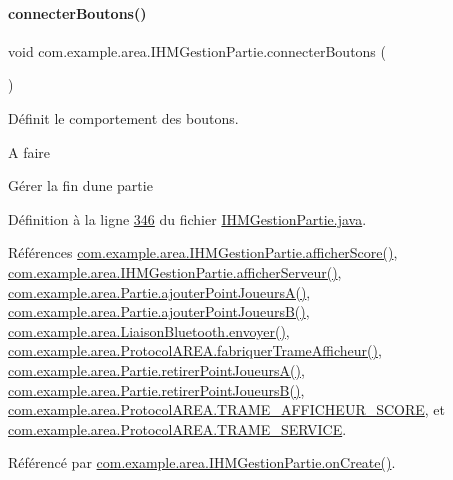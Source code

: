 \paragraph{\texorpdfstring{connecter\+Boutons()}{connecterBoutons()}}
{\footnotesize\ttfamily void com.\+example.\+area.\+I\+H\+M\+Gestion\+Partie.\+connecter\+Boutons (\begin{DoxyParamCaption}{ }\end{DoxyParamCaption})\hspace{0.3cm}{\ttfamily [private]}}



Définit le comportement des boutons. 

\begin{DoxyRefDesc}{A faire}
\item[\hyperlink{todo__todo000004}{A faire}]Gérer la fin d\textquotesingle{}une partie \end{DoxyRefDesc}


Définition à la ligne \hyperlink{_i_h_m_gestion_partie_8java_source_l00346}{346} du fichier \hyperlink{_i_h_m_gestion_partie_8java_source}{I\+H\+M\+Gestion\+Partie.\+java}.



Références \hyperlink{_i_h_m_gestion_partie_8java_source_l00435}{com.\+example.\+area.\+I\+H\+M\+Gestion\+Partie.\+afficher\+Score()}, \hyperlink{_i_h_m_gestion_partie_8java_source_l00447}{com.\+example.\+area.\+I\+H\+M\+Gestion\+Partie.\+afficher\+Serveur()}, \hyperlink{_partie_8java_source_l00128}{com.\+example.\+area.\+Partie.\+ajouter\+Point\+Joueurs\+A()}, \hyperlink{_partie_8java_source_l00147}{com.\+example.\+area.\+Partie.\+ajouter\+Point\+Joueurs\+B()}, \hyperlink{_liaison_bluetooth_8java_source_l00202}{com.\+example.\+area.\+Liaison\+Bluetooth.\+envoyer()}, \hyperlink{_protocol_a_r_e_a_8java_source_l00048}{com.\+example.\+area.\+Protocol\+A\+R\+E\+A.\+fabriquer\+Trame\+Afficheur()}, \hyperlink{_partie_8java_source_l00166}{com.\+example.\+area.\+Partie.\+retirer\+Point\+Joueurs\+A()}, \hyperlink{_partie_8java_source_l00179}{com.\+example.\+area.\+Partie.\+retirer\+Point\+Joueurs\+B()}, \hyperlink{_protocol_a_r_e_a_8java_source_l00037}{com.\+example.\+area.\+Protocol\+A\+R\+E\+A.\+T\+R\+A\+M\+E\+\_\+\+A\+F\+F\+I\+C\+H\+E\+U\+R\+\_\+\+S\+C\+O\+RE}, et \hyperlink{_protocol_a_r_e_a_8java_source_l00033}{com.\+example.\+area.\+Protocol\+A\+R\+E\+A.\+T\+R\+A\+M\+E\+\_\+\+S\+E\+R\+V\+I\+CE}.



Référencé par \hyperlink{_i_h_m_gestion_partie_8java_source_l00106}{com.\+example.\+area.\+I\+H\+M\+Gestion\+Partie.\+on\+Create()}.


